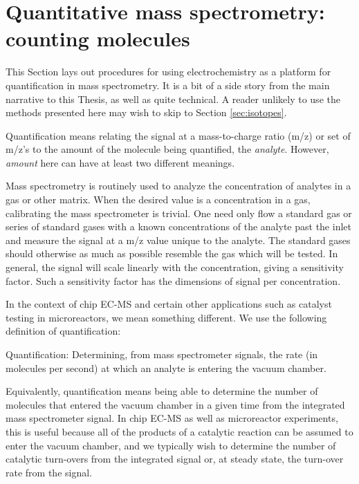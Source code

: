 

\section{Quantitative mass spectrometry: counting molecules}\label{sec:quantification}

This Section lays out procedures for using electrochemistry as a platform for quantification in mass spectrometry. It is a bit of a side story from the main narrative to this Thesis, as well as quite technical. A reader unlikely to use the methods presented here may wish to skip to Section \ref{sec:isotopes}.

Quantification means relating the signal at a mass-to-charge ratio (m/z) or set of m/z's to the amount of the molecule being quantified, the \textit{analyte}. However, \textit{amount} here can have at least two different meanings.

Mass spectrometry is routinely used to analyze the concentration of analytes in a gas or other matrix\cite{Harris2010, Gross2007}. When the desired value is a concentration in a gas, calibrating the mass spectrometer is trivial. One need only flow a standard gas or series of standard gases with a known concentrations of the analyte past the inlet and measure the signal at a m/z value unique to the analyte. The standard gases should otherwise as much as possible resemble the gas which will be tested. In general, the signal will scale linearly with the concentration, giving a sensitivity factor. Such a sensitivity factor has the dimensions of signal per concentration.

In the context of chip EC-MS and certain other applications such as catalyst testing in microreactors, we mean something different. We use the following definition of quantification:

\begin{definition}
	Quantification: Determining, from mass spectrometer signals, the rate (in molecules per second) at which an analyte is entering the vacuum chamber. \label{d:quantification}
\end{definition} 

Equivalently, quantification means being able to determine the number of molecules that entered the vacuum chamber in a given time from the integrated mass spectrometer signal. In chip EC-MS as well as microreactor experiments, this is useful because all of the products of a catalytic reaction can be assumed to enter the vacuum chamber, and we typically wish to determine the number of catalytic turn-overs from the integrated signal or, at steady state, the turn-over rate from the signal. 

